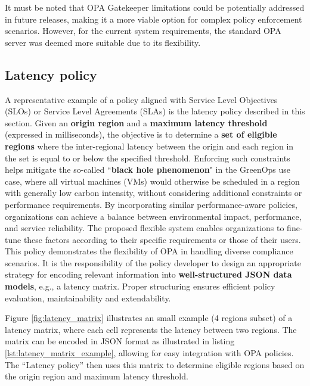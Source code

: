 It must be noted that OPA Gatekeeper limitations could be potentially addressed in future releases, making it a more viable option for complex policy enforcement scenarios. However, for the current system requirements, the standard OPA server was deemed more suitable due to its flexibility.

\subsection{Latency policy}

A representative example of a policy aligned with Service Level Objectives (SLOs) or Service Level Agreements (SLAs) is the latency policy described in this section.
Given an \textbf{origin region} and a \textbf{maximum latency threshold} (expressed in milliseconds), the objective is to determine a \textbf{set of eligible regions} where the inter-regional latency between the origin and each region in the set is equal to or below the specified threshold.
Enforcing such constraints helps mitigate the so-called ``\textbf{black hole phenomenon}" in the GreenOps use case, where all virtual machines (VMs) would otherwise be scheduled in a region with generally low carbon intensity, without considering additional constraints or performance requirements. By incorporating similar performance-aware policies, organizations can achieve a balance between environmental impact, performance, and service reliability.
The proposed flexible system enables organizations to fine-tune these factors according to their specific requirements or those of their users. 
This policy demonstrates the flexibility of OPA in handling diverse compliance scenarios. It is the responsibility of the policy developer to design an appropriate strategy for encoding relevant information into \textbf{well-structured JSON data models}, e.g., a latency matrix. Proper structuring ensures efficient policy evaluation, maintainability and extendability.

Figure \ref{fig:latency_matrix} illustrates an small example (4 regions subset) of a latency matrix, where each cell represents the latency between two regions. The matrix can be encoded in JSON format as illustrated in listing \ref{lst:latency_matrix_example}, allowing for easy integration with OPA policies. The ``Latency policy'' then uses this matrix to determine eligible regions based on the origin region and maximum latency threshold.

